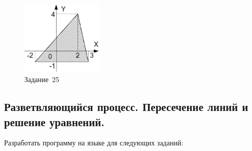 \begin{figure}[h]
\begin{center}
\includegraphics[width=0.35\textwidth]{img/ris_3_88}
\caption{Задание~25}
\label{ch03:refDrawing87}
\end{center}
\end{figure}


\subsection[Разветвляющийся процесс. Пересечение линий и решение уравнений.]{Разветвляющийся процесс. Пересечение
линий и решение уравнений.}
Разработать программу на языке  для следующих заданий:

